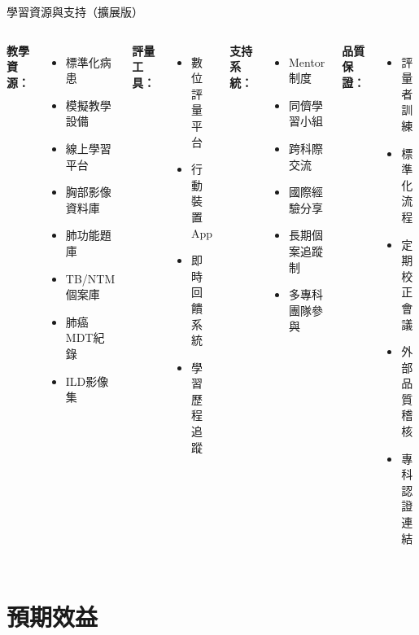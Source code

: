 \documentclass[aspectratio=169]{beamer}
\begin{document}
\begin{frame}{學習資源與支持（擴展版）}
\begin{columns}[c]
\textbf{教學資源：}
\begin{itemize}
\item 標準化病患
\item 模擬教學設備
\item 線上學習平台
\item 胸部影像資料庫
\item 肺功能題庫
\item \textcolor{emergency_red}{TB/NTM個案庫}
\item \textcolor{emergency_red}{肺癌MDT紀錄}
\item \textcolor{emergency_red}{ILD影像集}
\end{itemize}

\textbf{評量工具：}
\begin{itemize}
\item 數位評量平台
\item 行動裝置App
\item 即時回饋系統
\item 學習歷程追蹤
\end{itemize}

\textbf{支持系統：}
\begin{itemize}
\item Mentor制度
\item 同儕學習小組
\item 跨科際交流
\item 國際經驗分享
\item \textcolor{emergency_red}{長期個案追蹤制}
\item \textcolor{emergency_red}{多專科團隊參與}
\end{itemize}

\textbf{品質保證：}
\begin{itemize}
\item 評量者訓練
\item 標準化流程
\item 定期校正會議
\item 外部品質稽核
\item \textcolor{emergency_red}{專科認證連結}
\end{itemize}
\end{columns}
\end{frame}

\section{預期效益}
\end{document}
